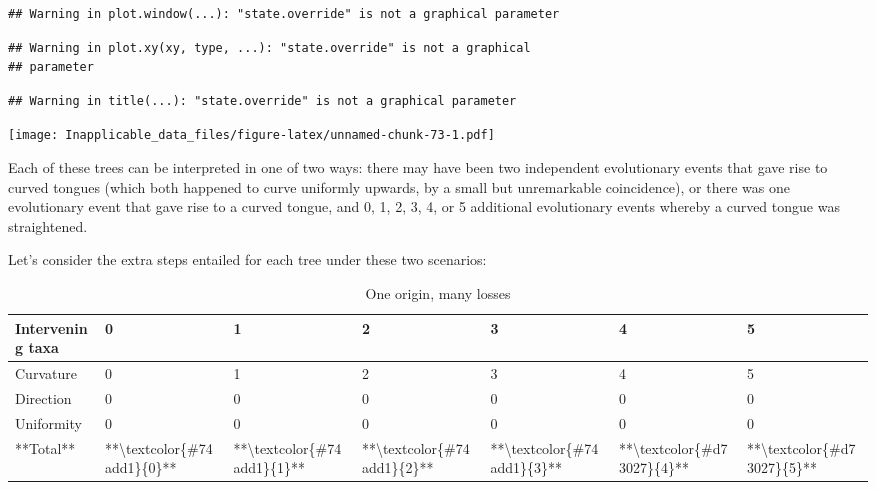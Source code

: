 \documentclass[]{book}
\theoremstyle{definition}
\theoremstyle{definition}
\theoremstyle{definition}
\theoremstyle{remark}
\begin{document}
\begin{verbatim}
## Warning in plot.window(...): "state.override" is not a graphical parameter
\end{verbatim}

\begin{verbatim}
## Warning in plot.xy(xy, type, ...): "state.override" is not a graphical
## parameter
\end{verbatim}

\begin{verbatim}
## Warning in title(...): "state.override" is not a graphical parameter
\end{verbatim}

\texttt{[image: Inapplicable\_data\_files/figure-latex/unnamed-chunk-73-1.pdf]}

Each of these trees can be interpreted in one of two ways: there may
have been two independent evolutionary events that gave rise to curved
tongues (which both happened to curve uniformly upwards, by a small but
unremarkable coincidence), or there was one evolutionary event that gave
rise to a curved tongue, and 0, 1, 2, 3, 4, or 5 additional evolutionary
events whereby a curved tongue was straightened.

Let's consider the extra steps entailed for each tree under these two
scenarios:

\begin{table}

\caption{\label{tab:iw-delaet-ew-a}One origin, many losses}
\centering
\begin{tabular}[t]{l|l|l|l|l|l|l}
\hline
Intervening taxa & 0 & 1 & 2 & 3 & 4 & 5\\
\hline
Curvature & 0 & 1 & 2 & 3 & 4 & 5\\
\hline
Direction & 0 & 0 & 0 & 0 & 0 & 0\\
\hline
Uniformity & 0 & 0 & 0 & 0 & 0 & 0\\
\hline
**Total** & **\textbackslash{}textcolor\{\#74add1\}\{0\}** & **\textbackslash{}textcolor\{\#74add1\}\{1\}** & **\textbackslash{}textcolor\{\#74add1\}\{2\}** & **\textbackslash{}textcolor\{\#74add1\}\{3\}** & **\textbackslash{}textcolor\{\#d73027\}\{4\}** & **\textbackslash{}textcolor\{\#d73027\}\{5\}**\\
\hline
\end{tabular}
\end{table}
\end{document}
